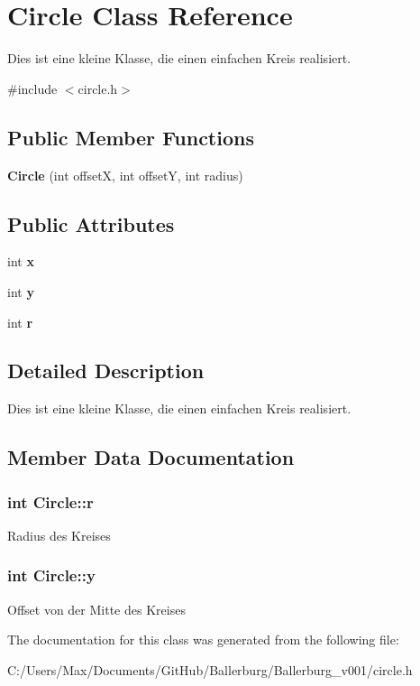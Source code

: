 \section{Circle Class Reference}
\label{class_circle}


Dies ist eine kleine Klasse, die einen einfachen Kreis realisiert.  




{\ttfamily \#include $<$circle.\+h$>$}

\subsection*{Public Member Functions}
\begin{DoxyCompactItemize}
\item 
{\bfseries Circle} (int offset\+X, int offset\+Y, int radius)\label{class_circle_a899b70433bcb874e6eab17a5d56fc6aa}

\end{DoxyCompactItemize}
\subsection*{Public Attributes}
\begin{DoxyCompactItemize}
\item 
int {\bfseries x}\label{class_circle_abceecd15b990054ddc30441cfcbb205d}

\item 
int {\bf y}
\item 
int {\bf r}
\end{DoxyCompactItemize}


\subsection{Detailed Description}
Dies ist eine kleine Klasse, die einen einfachen Kreis realisiert. 

\subsection{Member Data Documentation}
\subsubsection[{r}]{\setlength{\rightskip}{0pt plus 5cm}int Circle\+::r}\label{class_circle_a067c0b8ccbda5ca1f518dd89a1d55989}
Radius des Kreises 
\subsubsection[{y}]{\setlength{\rightskip}{0pt plus 5cm}int Circle\+::y}\label{class_circle_a78aef28b3c176d14e8d25f8cd84e7dfd}
Offset von der Mitte des Kreises 

The documentation for this class was generated from the following file\+:\begin{DoxyCompactItemize}
\item 
C\+:/\+Users/\+Max/\+Documents/\+Git\+Hub/\+Ballerburg/\+Ballerburg\+\_\+v001/circle.\+h\end{DoxyCompactItemize}
